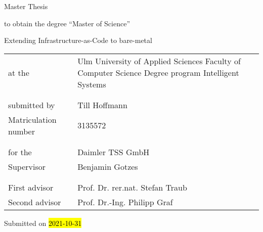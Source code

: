 \begin{titlepage}
  \vspace*{4cm}

  {\normalfont\sffamily\huge Master Thesis}

  \vspace{0.5cm}
  to obtain the degree \enquote{Master of Science}

  \vspace{2.0cm}
  {\normalfont\sffamily\large Extending Infrastructure-as-Code to bare-metal}

  \bigskip

  \begin{tabular}{ @{} p{} p{} }
      at the & Ulm University of Applied Sciences
      \newline
      Faculty of Computer Science
      \newline
      Degree program Intelligent Systems  \\
      & \\
      & \\
      submitted by & Till Hoffmann \\
      Matriculation number & 3135572 \\
      & \\
      & \\
      for the & Daimler TSS GmbH \\
      Supervisor & Benjamin Gotzes \\
      & \\
      & \\
      First advisor & Prof. Dr. rer.nat. Stefan Traub \\
      Second advisor & Prof. Dr.-Ing. Philipp Graf \\
  \end{tabular}

  \vspace{1cm}
  
  Submitted on \hl{2021-10-31}

\end{titlepage}
